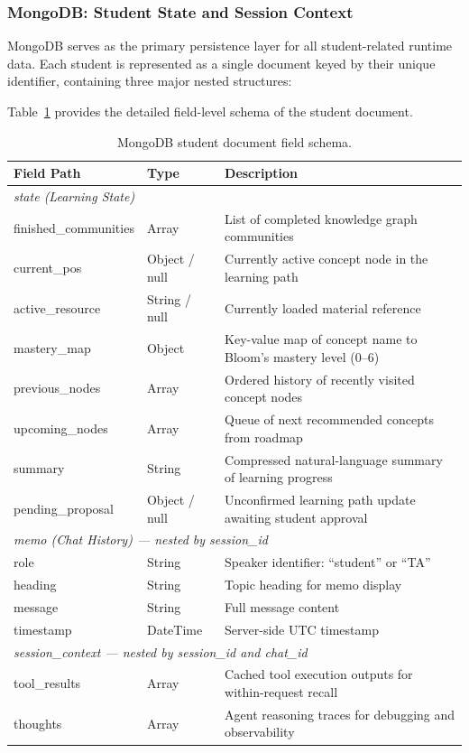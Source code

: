 \subsubsection{MongoDB: Student State and Session Context}

MongoDB serves as the primary persistence layer for all student-related runtime data. Each student is represented as a single document keyed by their unique identifier, containing three major nested structures:

Table~\ref{tab:mongo_fields} provides the detailed field-level schema of the student document.

\begin{table}[H]
\centering
\caption{MongoDB student document field schema.}
\label{tab:mongo_fields}
\renewcommand{\arraystretch}{1.2}
\begin{tabularx}{\textwidth}{|l|l|X|}
\hline
Field Path & Type & Description \\ \hline
\multicolumn{3}{|l|}{\textit{state (Learning State)}} \\ \hline
finished\_communities & Array & List of completed knowledge graph communities \\ \hline
current\_pos & Object / null & Currently active concept node in the learning path \\ \hline
active\_resource & String / null & Currently loaded material reference \\ \hline
mastery\_map & Object & Key-value map of concept name to Bloom's mastery level (0--6) \\ \hline
previous\_nodes & Array & Ordered history of recently visited concept nodes \\ \hline
upcoming\_nodes & Array & Queue of next recommended concepts from roadmap \\ \hline
summary & String & Compressed natural-language summary of learning progress \\ \hline
pending\_proposal & Object / null & Unconfirmed learning path update awaiting student approval \\ \hline
\multicolumn{3}{|l|}{\textit{memo (Chat History) --- nested by session\_id}} \\ \hline
role & String & Speaker identifier: ``student'' or ``TA'' \\ \hline
heading & String & Topic heading for memo display \\ \hline
message & String & Full message content \\ \hline
timestamp & DateTime & Server-side UTC timestamp \\ \hline
\multicolumn{3}{|l|}{\textit{session\_context --- nested by session\_id and chat\_id}} \\ \hline
tool\_results & Array & Cached tool execution outputs for within-request recall \\ \hline
thoughts & Array & Agent reasoning traces for debugging and observability \\ \hline
\end{tabularx}
\end{table}

